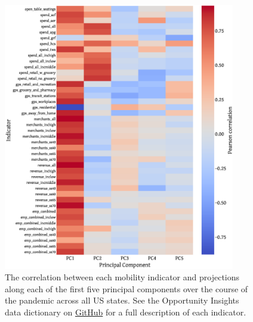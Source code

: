 \documentclass[dvipsnames]{article}
\newcommand{\ExternalLink}{%
    \tikz[x=1.2ex, y=1.2ex, baseline=-0.05ex]{%
        \begin{scope}[x=1ex, y=1ex]
            \clip (-0.1,-0.1) 
                --++ (-0, 1.2) 
                --++ (0.6, 0) 
                --++ (0, -0.6) 
                --++ (0.6, 0) 
                --++ (0, -1);
            \path[draw, 
                line width = 0.5, 
                rounded corners=0.5] 
                (0,0) rectangle (1,1);
        \end{scope}
        \path[draw, line width = 0.5] (0.5, 0.5) 
            -- (1, 1);
        \path[draw, line width = 0.5] (0.6, 1) 
            -- (1, 1) -- (1, 0.6);
            }
    }
\begin{document}
\begin{figure}
    \centering
    \includegraphics[width=0.9\textwidth]{corr_indicators_pca.eps}
    \caption{The correlation between each mobility indicator and projections along each of the first five principal components over the course of the pandemic across all US states. See the Opportunity Insights data dictionary on \href{https://github.com/OpportunityInsights/EconomicTracker/blob/main/docs/oi_tracker_data_dictionary.md}{GitHub} for a full description of each indicator.} %
    \label{fig:corr_indicators_pca}
\end{figure}
\end{document}
